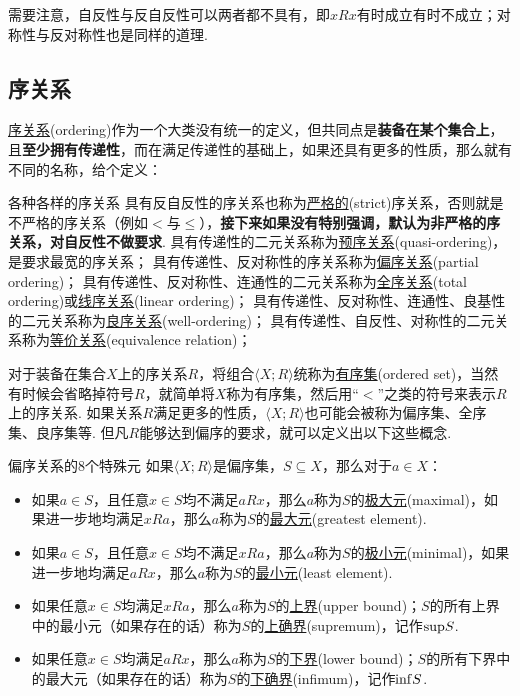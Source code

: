 需要注意，自反性与反自反性可以两者都不具有，即\(xRx\)有时成立有时不成立；对称性与反对称性也是同样的道理. 

\subsection{序关系}

\underline{序关系}(ordering)作为一个大类没有统一的定义，但共同点是\textbf{装备在某个集合上}，且\textbf{至少拥有传递性}，而在满足传递性的基础上，如果还具有更多的性质，那么就有不同的名称，给个定义：
\begin{definition}{各种各样的序关系}
    具有反自反性的序关系也称为\underline{严格的}(strict)序关系，否则就是不严格的序关系（例如\(<\)与\(\leq\)），\textbf{接下来如果没有特别强调，默认为非严格的序关系，对自反性不做要求}.
    \newline
    具有传递性的二元关系称为\underline{预序关系}(quasi-ordering)，是要求最宽的序关系；
    \newline
    具有传递性、反对称性的序关系称为\underline{偏序关系}(partial ordering)；
    \newline
    具有传递性、反对称性、连通性的二元关系称为\underline{全序关系}(total ordering)或\underline{线序关系}(linear ordering)；
    \newline
    具有传递性、反对称性、连通性、良基性的二元关系称为\underline{良序关系}(well-ordering)；
    \newline
    具有传递性、自反性、对称性的二元关系称为\underline{等价关系}(equivalence relation)；
\end{definition}
对于装备在集合\(X\)上的序关系\(R\)，将组合\(\langle X; R\rangle\)统称为\underline{有序集}(ordered set)，当然有时候会省略掉符号\(R\)，就简单将\(X\)称为有序集，然后用“\(<\)”之类的符号来表示\(R\)上的序关系. 如果关系\(R\)满足更多的性质，\(\langle X; R\rangle\)也可能会被称为偏序集、全序集、良序集等. 但凡\(R\)能够达到偏序的要求，就可以定义出以下这些概念.

\begin{definition}{偏序关系的8个特殊元}
    如果\(\langle X; R\rangle\)是偏序集，\(S \subseteq X\)，那么对于\(a \in X\)：
    \begin{itemize}
        \item  如果\(a \in S\)，且任意\(x \in S\)均不满足\(aRx\)，那么\(a\)称为\(S\)的\underline{极大元}(maximal)，如果进一步地均满足\(xRa\)，那么\(a\)称为\(S\)的\underline{最大元}(greatest element).
        \item  如果\(a \in S\)，且任意\(x \in S\)均不满足\(xRa\)，那么\(a\)称为\(S\)的\underline{极小元}(minimal)，如果进一步地均满足\(aRx\)，那么\(a\)称为\(S\)的\underline{最小元}(least element).
        \item  如果任意\(x \in S\)均满足\(xRa\)，那么\(a\)称为\(S\)的\underline{上界}(upper bound)；\(S\)的所有上界中的最小元（如果存在的话）称为\(S\)的\underline{上确界}(supremum)，记作\({\rm sup}S\).
        \item  如果任意\(x \in S\)均满足\(aRx\)，那么\(a\)称为\(S\)的\underline{下界}(lower bound)；\(S\)的所有下界中的最大元（如果存在的话）称为\(S\)的\underline{下确界}(infimum)，记作\({\rm inf}S\).
    \end{itemize}
\end{definition}

